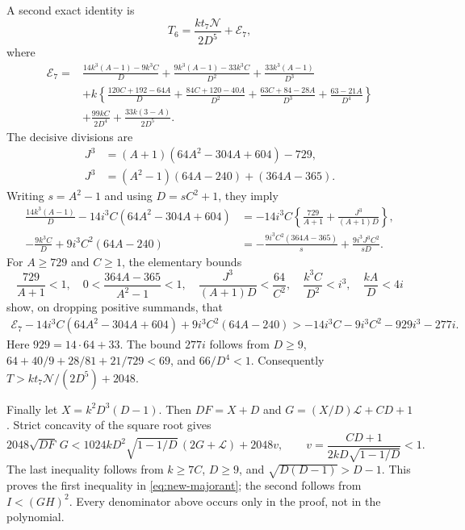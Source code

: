 A second exact identity is
\[
 T_6=\frac{kt_7\mathcal N}{2D^5}+\mathcal E_7,
\]
where
\begin{align*}
 \mathcal E_7={}&\frac{14k^3(A-1)-9k^3C}{D}
 +\frac{9k^3(A-1)-33k^3C}{D^2}
 +\frac{33k^3(A-1)}{D^3}\\
 &+k\left\{\frac{120C+192-64A}{D}
 +\frac{84C+120-40A}{D^2}
 +\frac{63C+84-28A}{D^3}
 +\frac{63-21A}{D^4}\right\}\\
 &+\frac{99kC}{2D^4}+\frac{33k(3-A)}{2D^5}.
\end{align*}
The decisive divisions are
\begin{align*}
 J^3&=(A+1)(64A^2-304A+604)-729,\\
 J^3&=(A^2-1)(64A-240)+(364A-365).
\end{align*}
Writing $s=A^2-1$ and using $D=sC^2+1$, they imply
\begin{align*}
 \frac{14k^3(A-1)}D-14i^3C(64A^2-304A+604)
 &=-14i^3C\left\{\frac{729}{A+1}
                    +\frac{J^3}{(A+1)D}\right\},\\
 -\frac{9k^3C}D+9i^3C^2(64A-240)
 &=-\frac{9i^3C^2(364A-365)}s
     +\frac{9i^3J^3C^2}{sD}.
\end{align*}
For $A\ge729$ and $C\ge1$, the elementary bounds
\[
 \frac{729}{A+1}<1,\quad
 0<\frac{364A-365}{A^2-1}<1,\quad
 \frac{J^3}{(A+1)D}<\frac{64}{C^2},\quad
 \frac{k^3C}{D^2}<i^3,\quad \frac{kA}{D}<4i
\]
show, on dropping positive summands, that
\begin{align*}
 \mathcal E_7-14i^3C(64A^2-304A+604)
   +9i^3C^2(64A-240)
 >-14i^3C-9i^3C^2-929i^3-277i.
\end{align*}
Here $929=14\cdot64+33$.  The bound $277i$ follows from
$D\ge9$,
$64+40/9+28/81+21/729<69$, and $66/D^4<1$.
Consequently $T>kt_7\mathcal N/(2D^5)+2048$.

Finally let $X=k^2D^3(D-1)$.  Then $DF=X+D$ and
$G=(X/D)\mathcal L+CD+1$.  Strict concavity of the square root gives
\[
 2048\sqrt{DF}\,G
 <1024kD^2\sqrt{1-1/D}\,(2G+\mathcal L)+2048v,
 \qquad
 v=\frac{CD+1}{2kD\sqrt{1-1/D}}<1.
\]
The last inequality follows from $k\ge7C$, $D\ge9$, and
$\sqrt{D(D-1)}>D-1$.  This proves the first inequality in
\eqref{eq:new-majorant}; the second follows from $I<(GH)^2$.
Every denominator above occurs only in the proof, not in the polynomial.

